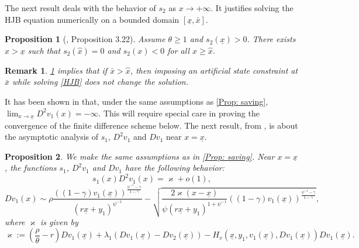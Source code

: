 \documentclass[11pt]{article}
\numberwithin{equation}{section}
\numberwithin{algorithm}{section}
\newtheorem{proposition}[proposition]{Proposition}
\newtheorem{remark}[remark]{Remark}
\newcommand{\lc}{\left(}
\newcommand{\rc}{\right)}
\newcommand{\ux}{{\underline x}}
\newcommand{\beq}{\begin{equation}}
\newcommand{\eeq}{\end{equation}}
\newcommand{\g}{\gamma}
\newcommand{\p}{\psi}
\theoremstyle{plain}
\begin{document}
The next result deals with the behavior of $s_2$ as $x\to +\infty$. It justifies solving the HJB equation numerically on a bounded domain $[\ux,\bar{x}]$. 
\begin{proposition}[\cite{Achdou:2026aa}, Proposition 3.22]\label{Prop: s2 barx}
Assume $\theta \geq 1$ and $s_2(\ux)>0$. There exists $\widehat{x}>\ux$ such that $s_2(\widehat{x})=0$ and $s_2(x)<0$ for all $x\geq \widehat{x}$.
\end{proposition}
\begin{remark}
\cref{Prop: s2 barx} implies that if $\bar{x}>\widehat{x}$, then imposing an artificial state constraint at $\bar{x}$ while solving \cref{HJB} does not change the solution.
\end{remark}
It has been shown in \cite[Corollary 3.19]{Achdou:2026aa} that, under the same assumptions as \cref{Prop: saving},  $\lim_{x\to \ux}D^2v_1(x)=-\infty$. This will require special care in proving the convergence of the finite difference scheme below. The next result, from \cite[Appendix C]{Achdou:2026aa}, is about the asymptotic analysis of $s_1$, $D^2v_1$ and $Dv_1$ near $x=\ux$. 
\begin{proposition}\label{Prop: Dv1 ux}
We make the same assumptions as in \cref{Prop: saving}. Near $x=\ux$, the functions $s_1$, $D^2v_1$ and $Dv_1$ have the following behavior: 
\beq\label{Eq: s1D2v1 ux}
s_1(x)D^2v_1(x)= \varkappa+o(1),
\eeq
\beq\label{Eq: Dv1 ux}
Dv_1(x)\sim \rho\frac{((1-\g)v_1(\ux))^{\frac{\p^{-1}-\g}{1-\g}}}{ (r\ux+y_1)^{\p^{-1}}}-\sqrt{\frac{2\varkappa(x-\ux)}{\p \lc r\ux+y_1\rc^{1+\p^{-1}}} ((1-\g)v_1(\ux))^{\frac{\p^{-1}-\g}{1-\g}}},
\eeq
where $\varkappa$ is given by
\beq\label{Eq: varkappa}
\varkappa:=\lc \frac{\rho}{\theta}-r\rc Dv_1(\ux)+\lambda_1(Dv_1(\ux)-Dv_2(\ux))-H_v(\ux,y_1,v_1(\ux),Dv_1(\ux))Dv_1(\ux).
\eeq
\end{proposition}
\end{document}
